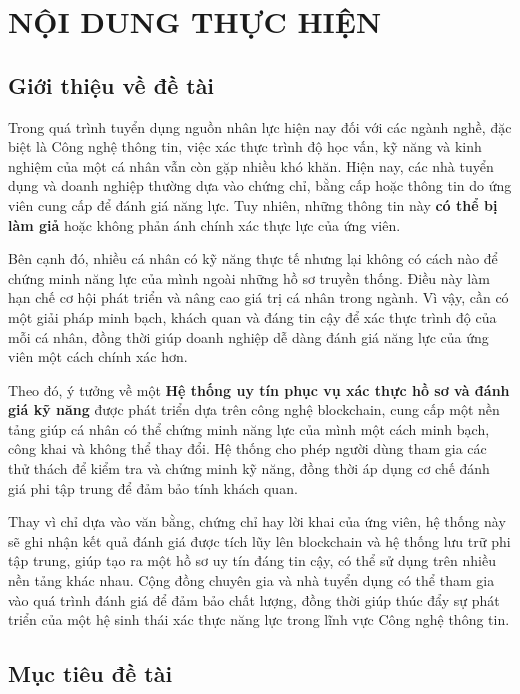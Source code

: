 \documentclass{article}[14pt]
\begin{document}
    \section{NỘI DUNG THỰC HIỆN}
    {
        
    \subsection{Giới thiệu về đề tài}
    
    Trong quá trình tuyển dụng nguồn nhân lực hiện nay đối với các ngành nghề, đặc biệt là Công nghệ thông tin, 
    việc xác thực trình độ học vấn, kỹ năng và kinh nghiệm của một cá nhân vẫn còn gặp nhiều khó khăn. 
    Hiện nay, các nhà tuyển dụng và doanh nghiệp thường dựa vào chứng chỉ, bằng cấp hoặc thông tin do ứng viên cung cấp để đánh giá năng lực. 
    Tuy nhiên, những thông tin này \textbf{có thể bị làm giả} hoặc không phản ánh chính xác thực lực của ứng viên.

    Bên cạnh đó, nhiều cá nhân có kỹ năng thực tế nhưng lại không có cách nào để chứng minh năng lực của mình ngoài những hồ sơ truyền thống. 
    Điều này làm hạn chế cơ hội phát triển và nâng cao giá trị cá nhân trong ngành. 
    Vì vậy, cần có một giải pháp minh bạch, khách quan và đáng tin cậy để xác thực trình độ của mỗi cá nhân, 
    đồng thời giúp doanh nghiệp dễ dàng đánh giá năng lực của ứng viên một cách chính xác hơn.

    Theo đó, ý tưởng về một \textbf{Hệ thống uy tín phục vụ xác thực hồ sơ và đánh giá kỹ năng} được phát triển dựa trên công nghệ blockchain, 
    cung cấp một nền tảng giúp cá nhân có thể chứng minh năng lực của mình một cách minh bạch, công khai và không thể thay đổi. 
    Hệ thống cho phép người dùng tham gia các thử thách để kiểm tra và chứng minh kỹ năng, đồng thời áp dụng cơ chế đánh giá phi tập trung để đảm bảo tính khách quan.

    Thay vì chỉ dựa vào văn bằng, chứng chỉ hay lời khai của ứng viên, hệ thống này sẽ ghi nhận kết quả đánh giá được tích lũy lên blockchain và hệ thống lưu trữ phi tập trung, 
    giúp tạo ra một hồ sơ uy tín đáng tin cậy, có thể sử dụng trên nhiều nền tảng khác nhau. 
    Cộng đồng chuyên gia và nhà tuyển dụng có thể tham gia vào quá trình đánh giá để đảm bảo chất lượng, 
    đồng thời giúp thúc đẩy sự phát triển của một hệ sinh thái xác thực năng lực trong lĩnh vực Công nghệ thông tin.
    
    \subsection{Mục tiêu đề tài}

}
\end{document}
